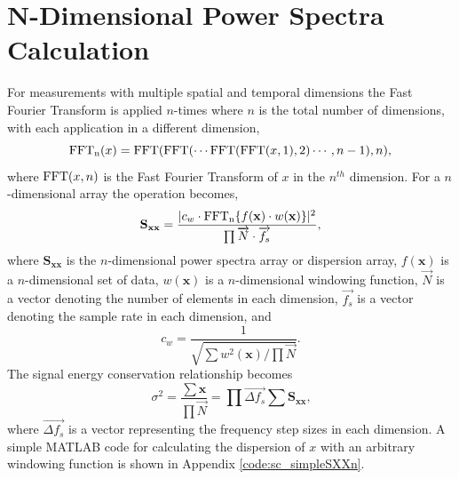 \section{N-Dimensional Power Spectra Calculation}
For measurements with multiple spatial and temporal dimensions the Fast Fourier Transform is applied $n$-times where $n$ is the total number of dimensions, with each application in a different dimension,
\begin{equation}
 \operatorname{FFT_n}(x) = \operatorname{FFT}(\operatorname{FFT}(\cdots\operatorname{FFT}(\operatorname{FFT}(x,1),2)\cdots,n-1),n) \textrm{,}
 \label{eqn:04_fftn}
\end{equation}
where $\operatorname{FFT}(x,n)$ is the Fast Fourier Transform of $x$ in the $n^{th}$ dimension.
For a $n$-dimensional array the operation becomes,
\begin{equation}
 \mathbf{S_{xx}} =\frac{|c_w\cdot\operatorname{FFT_n}\{f(\mathbf{x})\cdot w(\mathbf{x})\}|^2}{\prod{\overrightarrow{N}\cdot\overrightarrow{f_s}}} \textrm{,}
 \label{eqn:04_sxxn}
\end{equation}
where $\mathbf{S_{xx}}$ is the $n$-dimensional power spectra array or dispersion array, $f(\mathbf{x})$ is a $n$-dimensional set of data, $w(\mathbf{x})$ is a $n$-dimensional windowing function, $\overrightarrow{N}$ is a vector denoting the number of elements in each dimension, $\overrightarrow{f_s}$ is a vector denoting the sample rate in each dimension, and
\begin{equation}
 c_w = \frac{1}{\sqrt{\sum w^2(\mathbf{x})/\prod{\overrightarrow{N}}}} \textrm{.}
 \label{eqn:04_windown}
\end{equation}
The signal energy conservation relationship becomes
\begin{equation}
  \sigma^2=\frac{\sum\mathbf{x}}{\prod{\overrightarrow{N}}} = \prod{\overrightarrow{\Delta f_s}}\sum\mathbf{S_{xx}} \textrm{,}
  \label{eqn:04_fftn_energy_conservation}
\end{equation}
where $\overrightarrow{\Delta f_s}$ is a vector representing the frequency step sizes in each dimension.
A simple MATLAB code for calculating the dispersion of $x$ with an arbitrary windowing function is shown in Appendix \ref{code:sc_simpleSXXn}.

